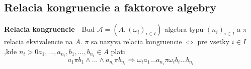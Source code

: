 \documentclass[12pt]{article}
\begin{document}
\subsection{Relacia kongruencie a faktorove algebry}
\textbf{Relacia kongruencie} - Bud $\mathcal{A} = (A, (\omega_{i})_{i \in I})$ algebra typu $(n_{i})_{i \in I}$
a $\pi$ relacia ekvivalencie na $A$. $\pi$ sa nazyva relacia kongruencie $\Leftrightarrow$ pre vsetky $i \in I$
,kde $n_{i} > 0 a_{1},...,a_{n_{i}},b_{1},...,b_{n_{i}} \in A$ plati
\begin{equation*}
	a_{1}\pi b_{1} \land ... \land a_{n_{i}}\pi b_{n_{i}} \Rightarrow \omega_{i}a_{1}...a_{n_{i}}\pi \omega_{i}b_{i}...b_{n_{i}}
\end{equation*}
\end{document}
